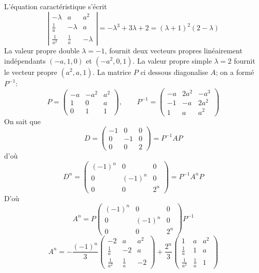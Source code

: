 \documentclass{article}[11pt]
\begin{document}
\begin{enumerate}
L'équation caractéristique s'écrit
\[\left|\begin{array}{ccc}
 -\lambda&a&a^2\\ \frac 1a&-\lambda&a\\\frac{1}{a^2}&\frac 1a&-\lambda
\end{array}\right|=-\lambda^3+3\lambda+2=(\lambda+1)^2(2-\lambda)
\]
La valeur propre double $\lambda=-1$, fournit deux vecteurs propres linéairement indépendants $(-a,1,0)$ et $(-a^2,0,1)$. La valeur propre simple $\lambda=2$ fournit le vecteur propre $(a^2,a,1)$. La matrice $P$ ci dessous diagonalise $A$; on a formé $P^{-1}$:
\[P=\left(\begin{array}{ccc}
 -a&-a^2&a^2\\ 1&0&a\\0&1&1
\end{array}\right),\qquad P^{-1}=\left(\begin{array}{ccc}
 -a&2a^2&-a^3\\ -1&-a&2a^2\\1&a&a^2
\end{array}\right)\]
On sait que
\[D=\left(\begin{array}{ccc} -1&0&0\\ 0&-1&0\\0&0&2
\end{array}\right)=P^{-1}AP\]
d'où
\[D^n=\left(\begin{array}{ccc} (-1)^n&0&0\\ 0&(-1)^n&0\\0&0&2^n
\end{array}\right)=P^{-1}A^nP\]
D'où
\[A^n=P\left(\begin{array}{ccc} (-1)^n&0&0\\ 0&(-1)^n&0\\0&0&2^n
\end{array}\right)P^{-1}\]
\[A^n=-\frac{(-1)^n}{3}\left(\begin{array}{ccc} -2&a&a^2\\ \frac 1a&-2&a\\\frac{1}{a^2}&\frac 1a&-2
\end{array}\right)+\frac{2^n}{3}\left(\begin{array}{ccc} 1&a&a^2\\ \frac 1a&1&a\\\frac{1}{a^2}&\frac 1a&1
\end{array}\right)\]



\end{enumerate}
\end{document}
